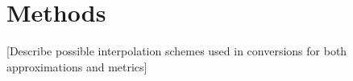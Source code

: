 \documentclass[\docopts]{\docclass}
\begin{document}


%



\section{Methods}
\label{sec:methods}

[Describe possible interpolation schemes used in conversions for both approximations and metrics]

%
%
%
\end{document}
